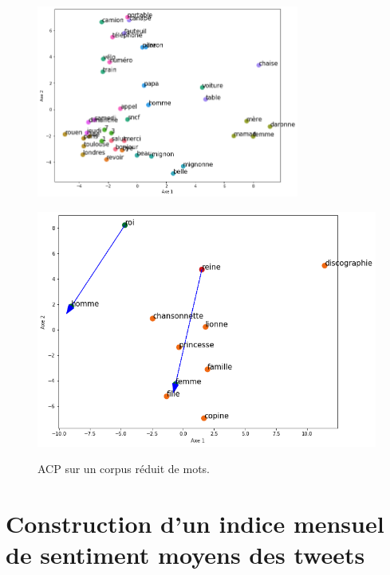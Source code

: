 \documentclass[10pt,french,french]{article}
\begin{document}
\begin{figure}[h]
\begin{minipage}{.5\textwidth}
\centering
\includegraphics[width=0.77\textwidth]{img/acp_gensim.png}
\captionsetup{margin=0cm,format=hang,justification=justified}
\caption{ACP sur un corpus réduit de mots.}\label{fig:acp_gensim}
\end{minipage}%
\begin{minipage}{.5\textwidth}
   \centering
  \includegraphics[width=0.8\linewidth]{img/acp_reine.png}
  \label{fig:acp_reine}
\end{minipage}%
\end{figure}

\newpage

\hypertarget{sec:sentimentalAnalysis}{%
\section{Construction d'un indice mensuel de sentiment moyens des tweets}\label{sec:sentimentalAnalysis}}
\end{document}
